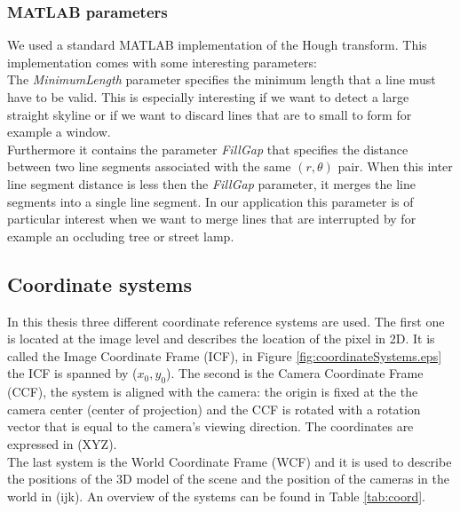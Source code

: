 \subsubsection{MATLAB\cite{matlab} parameters}
We used a standard MATLAB\cite{matlab} implementation of the Hough transform.  This implementation comes with some interesting parameters:\\

	The \emph{MinimumLength} parameter specifies the minimum length that a line must have to be valid. This is especially interesting if we want to detect a large straight skyline or if we want to discard lines that are to small to form for example a window.\\

	Furthermore it contains the parameter \emph{FillGap} that specifies the distance
	between two line segments associated with the same $(r, \theta)$ pair.
	When this inter line segment distance is less then the \emph{FillGap} parameter, it merges the line segments into a single line segment. In our application this parameter is of particular interest when we want to merge lines that are interrupted by for example an occluding tree or street lamp.\\



\subsection{Coordinate systems}
In this thesis three different coordinate reference systems are used. 
The first one is located at the image level and describes the
location of the pixel in 2D. It is called the Image Coordinate Frame (ICF), in
Figure \ref{fig:coordinateSystems.eps} the ICF is spanned by ($x_0,y_0$).
The second is the Camera Coordinate Frame (CCF), the system is aligned with the
camera: the origin is fixed at the the camera center (center of projection) and the CCF is rotated with
a rotation vector that is equal to the camera's viewing direction.  The coordinates are
expressed in (XYZ). \\
The last system is the World Coordinate Frame (WCF) and it is used to describe the positions of the 3D model of the
scene and the position of the cameras in the world in (ijk). An overview of the
systems can be found in Table \ref{tab:coord}.

